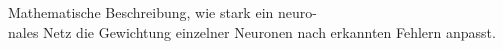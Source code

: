\documentclass[preview]{standalone}
\begin{document}
\begin{center}
\noindent Mathematische Beschreibung, wie stark ein neuro- \\ nales Netz die Gewichtung einzelner Neuronen nach erkannten Fehlern anpasst.
\end{center}
\end{document}
